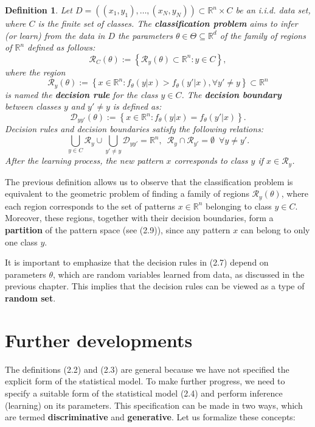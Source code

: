 \documentclass{report}
\newtheorem{definition}{Definition}[chapter]
\begin{document}
\begin{definition}
Let $D = ((x_1,y_1),\dots,(x_N,y_N)) \subset \mathbb{R}^n\times C$ be an i.i.d. data set, where $C$ is the finite set of classes. The \textbf{classification problem} aims to infer (or learn) from the data in $D$ the parameters $\theta \in \Theta \subseteq \mathbb{R}^d$ of the family of regions of $\mathbb{R}^n$ defined as follows:
\begin{equation}
\mathcal{R}_C(\theta) := \left\{\mathcal{R}_y(\theta) \subset \mathbb{R}^n : y \in C\right\},
\end{equation}
where the region
\begin{equation}
\mathcal{R}_y(\theta) := \left\{x \in \mathbb{R}^n : f_\theta(y|x) > f_\theta(y'|x), \forall y' \neq y\right\} \subset \mathbb{R}^n
\end{equation}
is named the \textbf{decision rule} for the class $y \in C$. The \textbf{decision boundary} between classes $y$ and $y'\neq y$ is defined as:
\begin{equation}
\mathcal{D}_{yy'}(\theta) :=\left\{x \in \mathbb{R}^n : f_\theta(y|x) = f_\theta(y'|x) \right\}.
\end{equation}
Decision rules and decision boundaries satisfy the following relations:
\begin{equation}
\bigcup_{y\in C}\mathcal{R}_y \cup \bigcup_{y'\neq y}\mathcal{D}_{yy'} = \mathbb{R}^n,\,\,\,\mathcal{R}_y\cap\mathcal{R}_{y'} = \emptyset\,\,\,\forall y \neq y'.
\end{equation}
After the learning process, the new pattern $x$ corresponds to class $y$ if $x \in \mathcal{R}_y$.
\end{definition}

The previous definition allows us to observe that the classification problem is equivalent to the geometric problem of finding a family of regions $\mathcal{R}_y(\theta)$, where each region corresponds to the set of patterns $x \in \mathbb{R}^n$ belonging to class $y \in C$. Moreover, these regions, together with their decision boundaries, form a \textbf{partition} of the pattern space (see (2.9)), since any pattern $x$ can belong to only one class $y$.

It is important to emphasize that the decision rules in (2.7) depend on parameters $\theta$, which are random variables learned from data, as discussed in the previous chapter. This implies that the decision rules can be viewed as a type of \textbf{random set}.

\section{Further developments}
The definitions (2.2) and (2.3) are general because we have not specified the explicit form of the statistical model. To make further progress, we need to specify a suitable form of the statistical model (2.4) and perform inference (learning) on its parameters. This specification can be made in two ways, which are termed \textbf{discriminative} and \textbf{generative}. Let us formalize these concepts:
\end{document}
